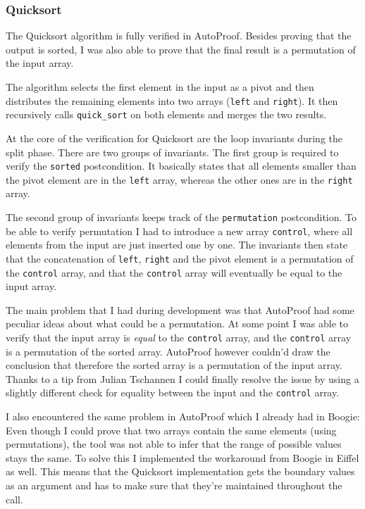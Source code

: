 \documentclass[a4paper,10pt]{article}
\begin{document}
\subsubsection{Quicksort}

The Quicksort algorithm is fully verified in AutoProof.
Besides proving that the output is sorted, I was also able to prove that the final result is a permutation of the input array.

The algorithm selects the first element in the input as a pivot and then distributes the remaining elements into two arrays (\lstinline!left! and \lstinline!right!).
It then recursively calls \lstinline!quick_sort! on both elements and merges the two results.

At the core of the verification for Quicksort are the loop invariants during the split phase.
There are two groups of invariants.
The first group is required to verify the \lstinline!sorted! postcondition.
It basically states that all elements smaller than the pivot element are in the \lstinline!left! array, whereas the other ones are in the \lstinline!right! array.

The second group of invariants keeps track of the \lstinline!permutation! postcondition.
To be able to verify permutation I had to introduce a new array \lstinline!control!, where all elements from the input are just inserted one by one.
The invariants then state that the concatenation of \lstinline!left!, \lstinline!right! and the pivot element is a permutation of the \lstinline!control! array,
and that the \lstinline!control! array will eventually be equal to the input array.

The main problem that I had during development was that AutoProof had some peculiar ideas about what could be a permutation.
At some point I was able to verify that the input array is \emph{equal} to the \lstinline!control! array, and the \lstinline!control! array is a permutation of the sorted array.
AutoProof however couldn'd draw the conclusion that therefore the sorted array is a permutation of the input array.
Thanks to a tip from Julian Tschannen I could finally resolve the issue by using a slightly different check for equality between the input and the \lstinline!control! array.

I also encountered the same problem in AutoProof which I already had in Boogie:
Even though I could prove that two arrays contain the same elements (using permutations), the tool was not able to infer that the range of possible values stays the same.
To solve this I implemented the workaround from Boogie in Eiffel as well.
This means that the Quicksort implementation gets the boundary values as an argument and has to make sure that they're maintained throughout the call.
\end{document}
